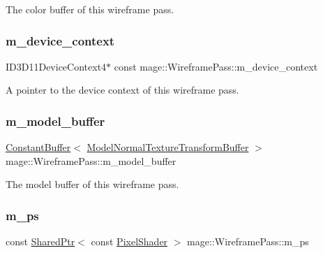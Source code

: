 The color buffer of this wireframe pass. \hypertarget{classmage_1_1_wireframe_pass_ac0f6bc1488ab515fe00d6e7abf230636}{}\label{classmage_1_1_wireframe_pass_ac0f6bc1488ab515fe00d6e7abf230636} 
\subsubsection{\texorpdfstring{m\+\_\+device\+\_\+context}{m\_device\_context}}
{\footnotesize\ttfamily I\+D3\+D11\+Device\+Context4$\ast$ const mage\+::\+Wireframe\+Pass\+::m\+\_\+device\+\_\+context\hspace{0.3cm}{\ttfamily [private]}}

A pointer to the device context of this wireframe pass. \hypertarget{classmage_1_1_wireframe_pass_aa7fb7cbba08fe8b4d7defab36d2e82a7}{}\label{classmage_1_1_wireframe_pass_aa7fb7cbba08fe8b4d7defab36d2e82a7} 
\subsubsection{\texorpdfstring{m\+\_\+model\+\_\+buffer}{m\_model\_buffer}}
{\footnotesize\ttfamily \hyperlink{classmage_1_1_constant_buffer}{Constant\+Buffer}$<$ \hyperlink{structmage_1_1_model_normal_texture_transform_buffer}{Model\+Normal\+Texture\+Transform\+Buffer} $>$ mage\+::\+Wireframe\+Pass\+::m\+\_\+model\+\_\+buffer\hspace{0.3cm}{\ttfamily [private]}}

The model buffer of this wireframe pass. \hypertarget{classmage_1_1_wireframe_pass_a39577f12ad9b3f72e703c290cbf46002}{}\label{classmage_1_1_wireframe_pass_a39577f12ad9b3f72e703c290cbf46002} 
\subsubsection{\texorpdfstring{m\+\_\+ps}{m\_ps}}
{\footnotesize\ttfamily const \hyperlink{namespacemage_a1e01ae66713838a7a67d30e44c67703e}{Shared\+Ptr}$<$ const \hyperlink{namespacemage_a27ecaf266420ee7a494d64edc0757129}{Pixel\+Shader} $>$ mage\+::\+Wireframe\+Pass\+::m\+\_\+ps\hspace{0.3cm}{\ttfamily [private]}}


